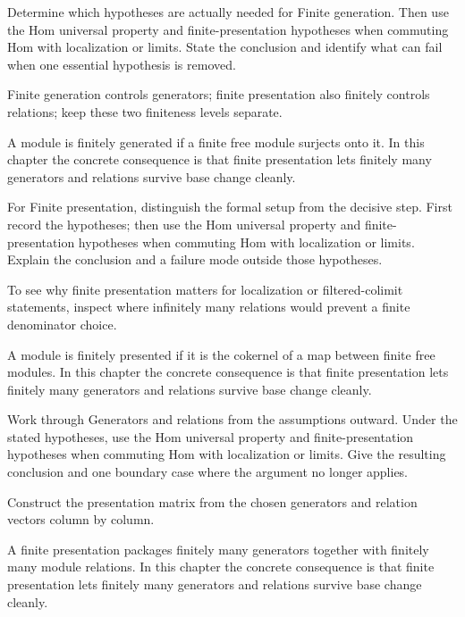 \begin{exercise}\label{exr:v12-04}
Determine which hypotheses are actually needed for Finite generation. Then use the Hom universal property and finite-presentation hypotheses when commuting Hom with localization or limits. State the conclusion and identify what can fail when one essential hypothesis is removed.
\end{exercise}
\begin{hint}
Finite generation controls generators; finite presentation also finitely controls relations; keep these two finiteness levels separate.
\end{hint}
\begin{solution}
A module is finitely generated if a finite free module surjects onto it. In this chapter the concrete consequence is that finite presentation lets finitely many generators and relations survive base change cleanly.
\end{solution}

\begin{exercise}\label{exr:v12-05}
For Finite presentation, distinguish the formal setup from the decisive step. First record the hypotheses; then use the Hom universal property and finite-presentation hypotheses when commuting Hom with localization or limits. Explain the conclusion and a failure mode outside those hypotheses.
\end{exercise}
\begin{hint}
To see why finite presentation matters for localization or filtered-colimit statements, inspect where infinitely many relations would prevent a finite denominator choice.
\end{hint}
\begin{solution}
A module is finitely presented if it is the cokernel of a map between finite free modules. In this chapter the concrete consequence is that finite presentation lets finitely many generators and relations survive base change cleanly.
\end{solution}

\begin{exercise}\label{exr:v12-06}
Work through Generators and relations from the assumptions outward. Under the stated hypotheses, use the Hom universal property and finite-presentation hypotheses when commuting Hom with localization or limits. Give the resulting conclusion and one boundary case where the argument no longer applies.
\end{exercise}
\begin{hint}
Construct the presentation matrix from the chosen generators and relation vectors column by column.
\end{hint}
\begin{solution}
A finite presentation packages finitely many generators together with finitely many module relations. In this chapter the concrete consequence is that finite presentation lets finitely many generators and relations survive base change cleanly.
\end{solution}


